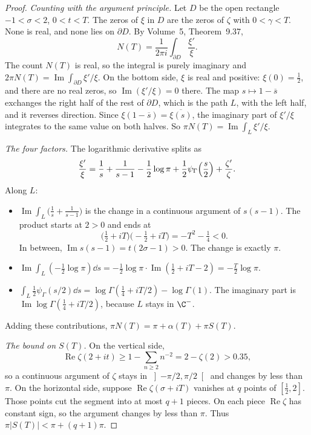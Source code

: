 \begin{proof}
\emph{Counting with the argument principle.} Let $D$ be the open rectangle $-1<\sigma<2$, $0<t<T$. The zeros of $\xi$ in $D$ are the zeros of $\zeta$ with $0<\gamma<T$. None is real, and none lies on $\partial D$. By Volume~5, Theorem~9.37,
\[
N(T)=\frac1{2\pi i}\int_{\partial D}\frac{\xi'}{\xi}.
\]
The count $N(T)$ is real, so the integral is purely imaginary and $2\pi N(T)=\operatorname{Im}\int_{\partial D}\xi'/\xi$. On the bottom side, $\xi$ is real and positive: $\xi(0)=\frac12$, and there are no real zeros, so $\operatorname{Im}(\xi'/\xi)=0$ there. The map $s\mapsto1-\overline s$ exchanges the right half of the rest of $\partial D$, which is the path $L$, with the left half, and it reverses direction. Since $\xi(1-\overline s)=\overline{\xi(s)}$, the imaginary part of $\xi'/\xi$ integrates to the same value on both halves. So $\pi N(T)=\operatorname{Im}\int_L\xi'/\xi$.

\emph{The four factors.} The logarithmic derivative splits as
\[
\frac{\xi'}{\xi}=\frac1s+\frac1{s-1}-\frac12\log\pi+\frac12\psi_\Gamma\Bigl(\frac s2\Bigr)+\frac{\zeta'}{\zeta}.
\]
Along $L$:
\begin{itemize}
\item $\operatorname{Im}\int_L\bigl(\frac1s+\frac1{s-1}\bigr)$ is the change in a continuous argument of $s(s-1)$. The product starts at $2>0$ and ends at
\[
\bigl(\tfrac12+iT\bigr)\bigl(-\tfrac12+iT\bigr)=-T^2-\tfrac14<0.
\]
In between, $\operatorname{Im}s(s-1)=t(2\sigma-1)>0$. The change is exactly $\pi$.
\item $\operatorname{Im}\int_L(-\frac12\log\pi)\dd s=-\frac12\log\pi\cdot\operatorname{Im}(\frac12+iT-2)=-\frac T2\log\pi$.
\item $\int_L\frac12\psi_\Gamma(s/2)\dd s=\log\Gamma(\frac14+iT/2)-\log\Gamma(1)$. The imaginary part is $\operatorname{Im}\log\Gamma(\frac14+iT/2)$, because $L$ stays in $\C^-$.
\end{itemize}
Adding these contributions, $\pi N(T)=\pi+\alpha(T)+\pi S(T)$.

\emph{The bound on $S(T)$.} On the vertical side,
\[
\operatorname{Re}\zeta(2+it)\ge1-\sum_{n\ge2}n^{-2}=2-\zeta(2)>0.35,
\]
so a continuous argument of $\zeta$ stays in $\left]-\pi/2,\pi/2\right[$ and changes by less than $\pi$. On the horizontal side, suppose $\operatorname{Re}\zeta(\sigma+iT)$ vanishes at $q$ points of $[\frac12,2]$. Those points cut the segment into at most $q+1$ pieces. On each piece $\operatorname{Re}\zeta$ has constant sign, so the argument changes by less than $\pi$. Thus $\pi|S(T)|<\pi+(q+1)\pi$.


\end{proof}
